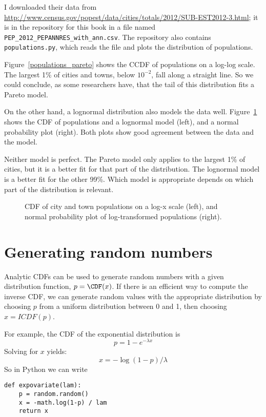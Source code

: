 I downloaded their data from
\url{http://www.census.gov/popest/data/cities/totals/2012/SUB-EST2012-3.html};
it is in the repository for this book in a file named
\verb"PEP_2012_PEPANNRES_with_ann.csv".  The repository also
contains {\tt populations.py}, which reads the file and plots
the distribution of populations.

Figure~\ref{populations_pareto} shows the CCDF of populations on a
log-log scale.  The largest 1\% of cities and towns, below $10^{-2}$,
fall along a straight line.  So we could
conclude, as some researchers have, that the tail of this distribution
fits a Pareto model.

On the other hand, a lognormal distribution also models the data well.
Figure~\ref{populations_normal} shows the CDF of populations and a
lognormal model (left), and a normal probability plot (right).  Both
plots show good agreement between the data and the model.

Neither model is perfect.
The Pareto model only applies to the largest 1\% of cities, but it
is a better fit for that part of the distribution.  The lognormal
model is a better fit for the other 99\%.
Which model is appropriate depends on which part of the distribution
is relevant.

\begin{figure}
\caption{CDF of city and town populations on a log-x scale (left), and
normal probability plot of log-transformed populations (right).}
\label{populations_normal}
\end{figure}


\section{Generating random numbers}

Analytic CDFs can be used to generate random numbers with a given
distribution function, $p = \CDF(x)$.  If there is an efficient way to
compute the inverse CDF, we can generate random values
with the appropriate distribution by choosing $p$ from a uniform
distribution between 0 and 1, then choosing
$x = ICDF(p)$.

For example, the CDF of the exponential distribution is
%
\[ p = 1 - e^{-\lambda x} \]
%
Solving for $x$ yields:
%
\[ x = -\log (1 - p) / \lambda \]
%
So in Python we can write
%
\begin{verbatim}
def expovariate(lam):
    p = random.random()
    x = -math.log(1-p) / lam
    return x
\end{verbatim}

